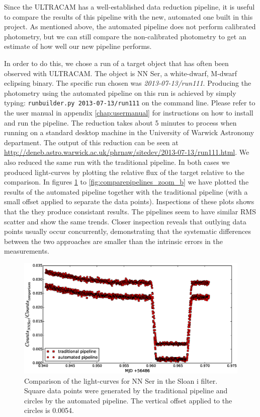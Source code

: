 Since the ULTRACAM has a well-established data reduction pipeline, it is useful to compare the results of this pipeline with the new, automated one built in this project. As mentioned above, the automated pipeline does not perform calibrated photometry, but we can still compare the non-calibrated photometry to get an estimate of how well our new pipeline performs.

In order to do this, we chose a run of a target object that has often been observed with ULTRACAM. The object is NN Ser, a white-dwarf, M-dwarf eclipsing binary. The specific run chosen was \emph{2013-07-13/run111}. Producing the photometry using the automated pipeline on this run is achieved by simply typing: \texttt{runbuilder.py 2013-07-13/run111} on the command line. Please refer to the user manual in appendix \ref{chap:usermanual} for instructions on how to install and run the pipeline.  The reduction takes about 5 minutes to process when running on a standard desktop machine in the University of Warwick Astronomy department. The output of this reduction can be seen at \url{http://deneb.astro.warwick.ac.uk/phrnaw/sitedev/2013-07-13/run111.html}. We also reduced the same run with the traditional pipeline. In both cases we produced light-curves by plotting the relative flux of the target relative to the comparison. In figures \ref{fig:comparepipelines_r} to \ref{fig:comparepipelines_zoom_b} we have plotted the results of the automated pipeline together with the traditional pipeline (with a small offset applied to separate the data points). Inspections of these plots shows that the they produce consistant results. The pipelines seem to have similar RMS scatter and show the same trends. Closer inspection reveals that outlying data points usually occur concurrently,  demonstrating that the systematic differences between the two approaches are smaller than the intrinsic errors in the measurements. 

\begin{figure}
\centering
\includegraphics[width=140mm]{images/nn_ser_compare_r.eps}
\caption{Comparison of the light-curves for NN Ser in the Sloan i filter. Square data points were generated by the traditional pipeline and circles by the automated pipeline. The vertical offset applied to the circles is 0.0054. }
\label{fig:comparepipelines_r}
\end{figure}

